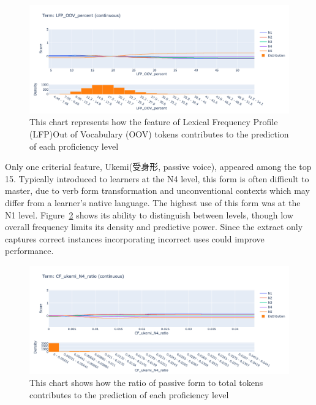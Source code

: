 \begin{figure}[h!]
    \centering
    \includegraphics[scale=.4]{img/EBM/EBMlfpOOV}
    \caption[Contribution of Percentage of Lexical Frequency Profile (LFP)Out of Vocabulary (OOV) tokens]{This chart represents how the feature of Lexical Frequency Profile (LFP)Out of Vocabulary (OOV) tokens contributes to the prediction of each proficiency level}
    \label{fig:EBMlfpOOV}
\end{figure}


Only one criterial feature, Ukemi(受身形, passive voice), appeared among the top 15.  Typically introduced to
learners at the N4 level, this form is often difficult to master, due to verb form transformation and unconventional
contexts which may differ from a learner's native language. The highest use of this form was at the N1 level. Figure~\ref{fig:EBMukemi} shows its ability to distinguish between levels, though low overall frequency limits its density and predictive power. Since the extract only captures correct instances incorporating incorrect uses could improve performance.

\begin{figure}[h!]
    \centering
    \includegraphics[scale=.4]{img/EBM/EBMukemi}
    \caption[Contribution of ratio of passive form (受身形、ukemi)]{This chart shows how the ratio of passive form to total tokens contributes to the prediction of each proficiency level}
    \label{fig:EBMukemi}
\end{figure}


